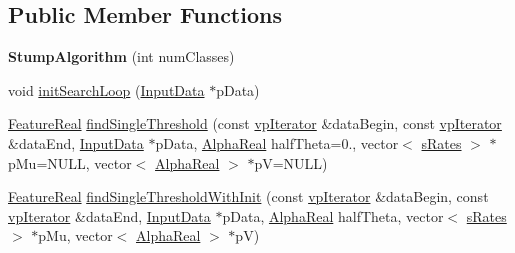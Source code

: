 \subsection*{Public Member Functions}
\begin{DoxyCompactItemize}
\item 
\hypertarget{classMultiBoost_1_1StumpAlgorithm_a0b6cb546c6ac6cfa94ddf036918da745}{{\bfseries Stump\-Algorithm} (int num\-Classes)}\label{classMultiBoost_1_1StumpAlgorithm_a0b6cb546c6ac6cfa94ddf036918da745}

\item 
void \hyperlink{classMultiBoost_1_1StumpAlgorithm_ab2ffb01e9585d6453ff3f1a418323c4e}{init\-Search\-Loop} (\hyperlink{classMultiBoost_1_1InputData}{Input\-Data} $\ast$p\-Data)
\item 
\hyperlink{Defaults_8h_a3a11cfe6a5d469d921716ca6291e934f}{Feature\-Real} \hyperlink{classMultiBoost_1_1StumpAlgorithm_a5a2f2cb9f4a1b90f63735607988c33ff}{find\-Single\-Threshold} (const \hyperlink{classMultiBoost_1_1StumpAlgorithm_a358eae7c8636c09b6b26ef0cc74bbd51}{vp\-Iterator} \&data\-Begin, const \hyperlink{classMultiBoost_1_1StumpAlgorithm_a358eae7c8636c09b6b26ef0cc74bbd51}{vp\-Iterator} \&data\-End, \hyperlink{classMultiBoost_1_1InputData}{Input\-Data} $\ast$p\-Data, \hyperlink{Defaults_8h_a80184c4fd10ab70a1a17c5f97dcd1563}{Alpha\-Real} half\-Theta=0., vector$<$ \hyperlink{structMultiBoost_1_1sRates}{s\-Rates} $>$ $\ast$p\-Mu=N\-U\-L\-L, vector$<$ \hyperlink{Defaults_8h_a80184c4fd10ab70a1a17c5f97dcd1563}{Alpha\-Real} $>$ $\ast$p\-V=N\-U\-L\-L)
\item 
\hyperlink{Defaults_8h_a3a11cfe6a5d469d921716ca6291e934f}{Feature\-Real} \hyperlink{classMultiBoost_1_1StumpAlgorithm_a62e7ed70157186e9ae83e7edec0cd4d7}{find\-Single\-Threshold\-With\-Init} (const \hyperlink{classMultiBoost_1_1StumpAlgorithm_a358eae7c8636c09b6b26ef0cc74bbd51}{vp\-Iterator} \&data\-Begin, const \hyperlink{classMultiBoost_1_1StumpAlgorithm_a358eae7c8636c09b6b26ef0cc74bbd51}{vp\-Iterator} \&data\-End, \hyperlink{classMultiBoost_1_1InputData}{Input\-Data} $\ast$p\-Data, \hyperlink{Defaults_8h_a80184c4fd10ab70a1a17c5f97dcd1563}{Alpha\-Real} half\-Theta, vector$<$ \hyperlink{structMultiBoost_1_1sRates}{s\-Rates} $>$ $\ast$p\-Mu, vector$<$ \hyperlink{Defaults_8h_a80184c4fd10ab70a1a17c5f97dcd1563}{Alpha\-Real} $>$ $\ast$p\-V)
\item 

\end{DoxyCompactItemize}
